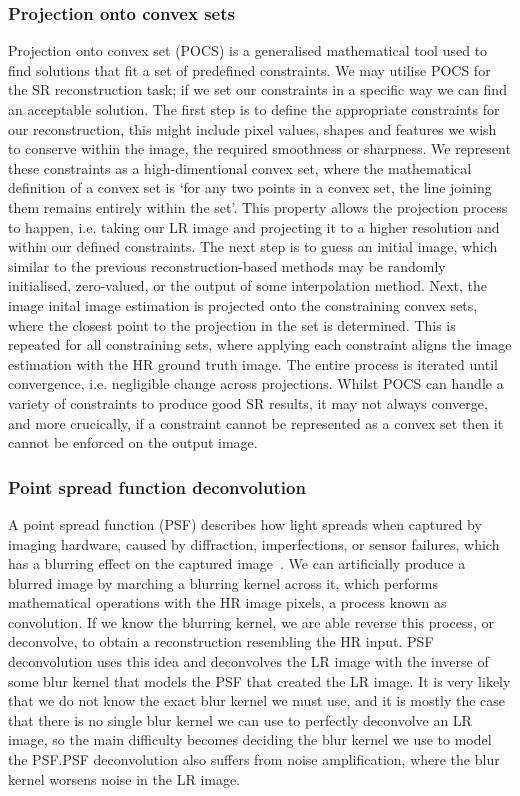 \subsubsection{Projection onto convex sets}
Projection onto convex set (POCS) is a generalised mathematical tool used to find solutions that fit a set of predefined constraints. We may utilise POCS for the SR reconstruction task; if we set our constraints in a specific way we can find an acceptable solution. The first step is to define the appropriate constraints for our reconstruction, this might include pixel values, shapes and features we wish to conserve within the image, the required smoothness or sharpness. We represent these constraints as a high-dimentional convex set, where the mathematical definition of a convex set is `for any two points in a convex set, the line joining them remains entirely within the set'. This property allows the projection process to happen, i.e. taking our LR image and projecting it to a higher resolution and within our defined constraints. The next step is to guess an initial image, which similar to the previous reconstruction-based methods may be randomly initialised, zero-valued, or the output of some interpolation method. Next, the image inital image estimation is projected onto the constraining convex sets, where the closest point to the projection in the set is determined. This is repeated for all constraining sets, where applying each constraint aligns the image estimation with the HR ground truth image. The entire process is iterated until convergence, i.e. negligible change across projections. Whilst POCS can handle a variety of constraints to produce good SR results, it may not always converge, and more crucically, if a constraint cannot be represented as a convex set then it cannot be enforced on the output image.

\subsubsection{Point spread function deconvolution}
A point spread function (PSF) describes how light spreads when captured by imaging hardware, caused by diffraction, imperfections, or sensor failures, which has a blurring effect on the captured image~\cite{ref}. We can artificially produce a blurred image by marching a blurring kernel across it, which performs mathematical operations with the HR image pixels, a process known as convolution. If we know the blurring kernel, we are able reverse this process, or deconvolve, to obtain a reconstruction resembling the HR input. PSF deconvolution uses this idea and deconvolves the LR image with the inverse of some blur kernel that models the PSF that created the LR image. It is very likely that we do not know the exact blur kernel we must use, and it is mostly the case that there is no single blur kernel we can use to perfectly deconvolve an LR image, so the main difficulty becomes deciding the blur kernel we use to model the PSF.\@ PSF deconvolution also suffers from noise amplification, where the blur kernel worsens noise in the LR image.


